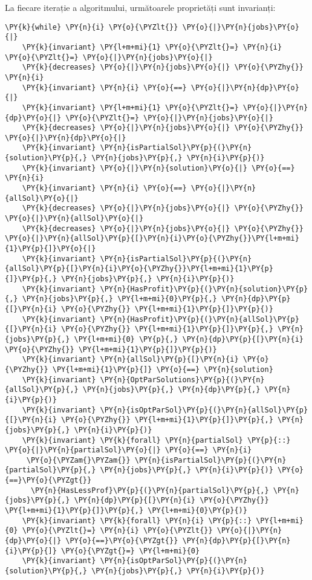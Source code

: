 La fiecare iterație a algoritmului, următoarele proprietăți sunt invarianți:
\begin{Verbatim}[commandchars=\\\{\},fontsize=\small]
\PY{k}{while} \PY{n}{i} \PY{o}{\PYZlt{}} \PY{o}{|}\PY{n}{jobs}\PY{o}{|}
    \PY{k}{invariant} \PY{l+m+mi}{1} \PY{o}{\PYZlt{}=} \PY{n}{i} \PY{o}{\PYZlt{}=} \PY{o}{|}\PY{n}{jobs}\PY{o}{|}
    \PY{k}{decreases} \PY{o}{|}\PY{n}{jobs}\PY{o}{|} \PY{o}{\PYZhy{}} \PY{n}{i}
    \PY{k}{invariant} \PY{n}{i} \PY{o}{==} \PY{o}{|}\PY{n}{dp}\PY{o}{|}
    \PY{k}{invariant} \PY{l+m+mi}{1} \PY{o}{\PYZlt{}=} \PY{o}{|}\PY{n}{dp}\PY{o}{|} \PY{o}{\PYZlt{}=} \PY{o}{|}\PY{n}{jobs}\PY{o}{|}
    \PY{k}{decreases} \PY{o}{|}\PY{n}{jobs}\PY{o}{|} \PY{o}{\PYZhy{}} \PY{o}{|}\PY{n}{dp}\PY{o}{|}
    \PY{k}{invariant} \PY{n}{isPartialSol}\PY{p}{(}\PY{n}{solution}\PY{p}{,} \PY{n}{jobs}\PY{p}{,} \PY{n}{i}\PY{p}{)}
    \PY{k}{invariant} \PY{o}{|}\PY{n}{solution}\PY{o}{|} \PY{o}{==} \PY{n}{i}
    \PY{k}{invariant} \PY{n}{i} \PY{o}{==} \PY{o}{|}\PY{n}{allSol}\PY{o}{|}
    \PY{k}{decreases} \PY{o}{|}\PY{n}{jobs}\PY{o}{|} \PY{o}{\PYZhy{}} \PY{o}{|}\PY{n}{allSol}\PY{o}{|}
    \PY{k}{decreases} \PY{o}{|}\PY{n}{jobs}\PY{o}{|} \PY{o}{\PYZhy{}} \PY{o}{|}\PY{n}{allSol}\PY{p}{[}\PY{n}{i}\PY{o}{\PYZhy{}}\PY{l+m+mi}{1}\PY{p}{]}\PY{o}{|}
    \PY{k}{invariant} \PY{n}{isPartialSol}\PY{p}{(}\PY{n}{allSol}\PY{p}{[}\PY{n}{i}\PY{o}{\PYZhy{}}\PY{l+m+mi}{1}\PY{p}{]}\PY{p}{,} \PY{n}{jobs}\PY{p}{,} \PY{n}{i}\PY{p}{)}
    \PY{k}{invariant} \PY{n}{HasProfit}\PY{p}{(}\PY{n}{solution}\PY{p}{,} \PY{n}{jobs}\PY{p}{,} \PY{l+m+mi}{0}\PY{p}{,} \PY{n}{dp}\PY{p}{[}\PY{n}{i} \PY{o}{\PYZhy{}} \PY{l+m+mi}{1}\PY{p}{]}\PY{p}{)}
    \PY{k}{invariant} \PY{n}{HasProfit}\PY{p}{(}\PY{n}{allSol}\PY{p}{[}\PY{n}{i} \PY{o}{\PYZhy{}} \PY{l+m+mi}{1}\PY{p}{]}\PY{p}{,} \PY{n}{jobs}\PY{p}{,} \PY{l+m+mi}{0} \PY{p}{,} \PY{n}{dp}\PY{p}{[}\PY{n}{i} \PY{o}{\PYZhy{}} \PY{l+m+mi}{1}\PY{p}{]}\PY{p}{)}
    \PY{k}{invariant} \PY{n}{allSol}\PY{p}{[}\PY{n}{i} \PY{o}{\PYZhy{}} \PY{l+m+mi}{1}\PY{p}{]} \PY{o}{==} \PY{n}{solution}
    \PY{k}{invariant} \PY{n}{OptParSolutions}\PY{p}{(}\PY{n}{allSol}\PY{p}{,} \PY{n}{jobs}\PY{p}{,} \PY{n}{dp}\PY{p}{,} \PY{n}{i}\PY{p}{)}
    \PY{k}{invariant} \PY{n}{isOptParSol}\PY{p}{(}\PY{n}{allSol}\PY{p}{[}\PY{n}{i} \PY{o}{\PYZhy{}} \PY{l+m+mi}{1}\PY{p}{]}\PY{p}{,} \PY{n}{jobs}\PY{p}{,} \PY{n}{i}\PY{p}{)}
    \PY{k}{invariant} \PY{k}{forall} \PY{n}{partialSol} \PY{p}{::} \PY{o}{|}\PY{n}{partialSol}\PY{o}{|} \PY{o}{==} \PY{n}{i} 
     \PY{o}{\PYZam{}\PYZam{}} \PY{n}{isPartialSol}\PY{p}{(}\PY{n}{partialSol}\PY{p}{,} \PY{n}{jobs}\PY{p}{,} \PY{n}{i}\PY{p}{)} \PY{o}{==}\PY{o}{\PYZgt{}}
      \PY{n}{HasLessProf}\PY{p}{(}\PY{n}{partialSol}\PY{p}{,} \PY{n}{jobs}\PY{p}{,} \PY{n}{dp}\PY{p}{[}\PY{n}{i} \PY{o}{\PYZhy{}} \PY{l+m+mi}{1}\PY{p}{]}\PY{p}{,} \PY{l+m+mi}{0}\PY{p}{)}
    \PY{k}{invariant} \PY{k}{forall} \PY{n}{i} \PY{p}{::} \PY{l+m+mi}{0} \PY{o}{\PYZlt{}=} \PY{n}{i} \PY{o}{\PYZlt{}} \PY{o}{|}\PY{n}{dp}\PY{o}{|} \PY{o}{==}\PY{o}{\PYZgt{}} \PY{n}{dp}\PY{p}{[}\PY{n}{i}\PY{p}{]} \PY{o}{\PYZgt{}=} \PY{l+m+mi}{0}
    \PY{k}{invariant} \PY{n}{isOptParSol}\PY{p}{(}\PY{n}{solution}\PY{p}{,} \PY{n}{jobs}\PY{p}{,} \PY{n}{i}\PY{p}{)}
\end{Verbatim}

